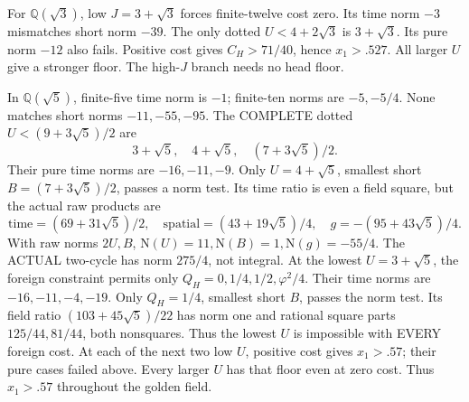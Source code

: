 For \(\mathbb Q(\sqrt3)\), low \(J=3+\sqrt3\)
forces finite-twelve cost zero.
Its time norm \(-3\) mismatches
short norm \(-39\).
The only dotted \(U<4+2\sqrt3\)
is \(3+\sqrt3\).
Its pure norm \(-12\) also fails.
Positive cost gives \(C_H>71/40\),
hence \(x_1>.527\).
All larger \(U\) give a stronger floor.
The high-\(J\) branch needs no head floor.

In \(\mathbb Q(\sqrt5)\), finite-five
time norm is \(-1\); finite-ten norms
are \(-5,-5/4\).
None matches short norms \(-11,-55,-95\).
The COMPLETE dotted \(U<(9+3\sqrt5)/2\)
are
\[
                         3+\sqrt5,\quad4+\sqrt5,\quad(7+3\sqrt5)/2 .
\]
Their pure time norms are \(-16,-11,-9\).
Only \(U=4+\sqrt5\), smallest short
\(B=(7+3\sqrt5)/2\), passes a norm test.
Its time ratio is even a field square,
but the actual raw products are
\[
 \text{time}=(69+31\sqrt5)/2,\quad
 \text{spatial}=(43+19\sqrt5)/4,\quad
                         g=-(95+43\sqrt5)/4 .
\]
With raw norms \(2U,B\),
\(\mathrm N(U)=11,\mathrm N(B)=1,
\mathrm N(g)=-55/4\).
The ACTUAL two-cycle has norm \(275/4\),
not integral.
At the lowest \(U=3+\sqrt5\), the foreign
constraint permits only
\(Q_H=0,1/4,1/2,\varphi^2/4\).
Their time norms are
\(-16,-11,-4,-19\).
Only \(Q_H=1/4\), smallest short \(B\),
passes the norm test.
Its field ratio \((103+45\sqrt5)/22\)
has norm one and rational square parts
\(125/44,81/44\), both nonsquares.
Thus the lowest \(U\) is impossible
with EVERY foreign cost.
At each of the next two low \(U\),
positive cost gives \(x_1>.57\);
their pure cases failed above.
Every larger \(U\) has that floor
even at zero cost.
Thus \(x_1>.57\) throughout the golden field.

